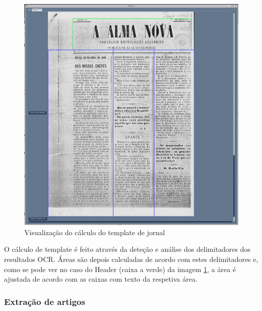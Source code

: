 \begin{figure}[H]
    \centering
    \includegraphics[width=1\textwidth]{images/implementacao/gui/gui_draw_template.png}
    \caption{Visualização do cálculo do template de jornal}
    \label{fig:gui_draw_template}
\end{figure}

O cálculo de template é feito através da deteção e análise dos delimitadores dos resultados OCR. Áreas são depois calculadas de acordo com estes delimitadores e, como se pode ver no caso do Header (caixa a verde) da imagem \ref{fig:gui_draw_template}, a área é ajustada de acordo com as caixas com texto da respetiva área.

\subsubsection{Extração de artigos}

